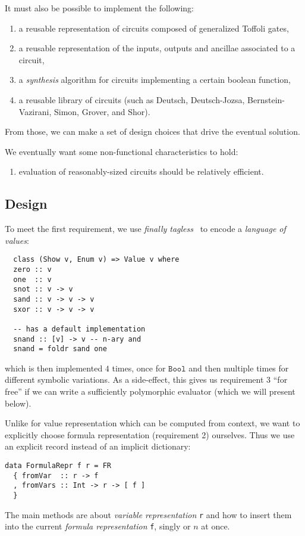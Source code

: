 \documentclass[sigplan,review]{acmart}
\begin{document}
\noindent It must also be possible to implement the following:
\begin{enumerate}[resume]
  \item a reusable representation of circuits composed of generalized Toffoli gates,
  \item a reusable representation of the inputs, outputs and ancillae associated to
    a circuit,
  \item a \emph{synthesis} algorithm for circuits implementing a certain boolean
    function,
  \item a reusable library of circuits (such as
    Deutsch, Deutsch-Jozsa, Bernstein-Vazirani, Simon, Grover, and Shor). 
\end{enumerate}
\noindent From those, we can make a
set of design choices that drive the eventual solution.

We eventually want some non-functional characteristics to hold:
\begin{enumerate}[resume]
  \item evaluation of reasonably-sized circuits should be relatively efficient.
\end{enumerate}

\subsection{Design}

To meet the first requirement, we use \emph{finally tagless}~\cite{tagless}
to encode a \emph{language of values}:
\begin{verbatim}
  class (Show v, Enum v) => Value v where
  zero :: v
  one  :: v
  snot :: v -> v
  sand :: v -> v -> v
  sxor :: v -> v -> v

  -- has a default implementation
  snand :: [v] -> v -- n-ary and
  snand = foldr sand one
\end{verbatim}
\noindent which is then implemented $4$ times, once for $\texttt{Bool}$
and then multiple times for different symbolic variations. As a side-effect,
this gives us requirement $3$ ``for free'' if we can write a sufficiently
polymorphic evaluator (which we will present below).

Unlike for value representation which can be computed from context, we want
to explicitly choose formula representation (requirement 2) ourselves. Thus we
use an explicit record instead of an implicit dictionary:
\begin{verbatim}
data FormulaRepr f r = FR 
  { fromVar  :: r -> f
  , fromVars :: Int -> r -> [ f ]
  }
\end{verbatim}
\noindent The main methods are about \emph{variable representation} \texttt{r}
and how to insert them into the current \emph{formula representation} \texttt{f},
singly or $n$ at once.
\end{document}
